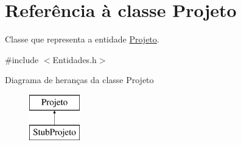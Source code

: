\hypertarget{class_projeto}{
\section{\-Referência à classe \-Projeto}
\label{class_projeto}
}


\-Classe que representa a entidade \hyperlink{class_projeto}{\-Projeto}.  




{\ttfamily \#include $<$\-Entidades.\-h$>$}

\-Diagrama de heranças da classe \-Projeto\begin{figure}[H]
\begin{center}
\leavevmode
\includegraphics[height=2.000000cm]{class_projeto}
\end{center}
\end{figure}
